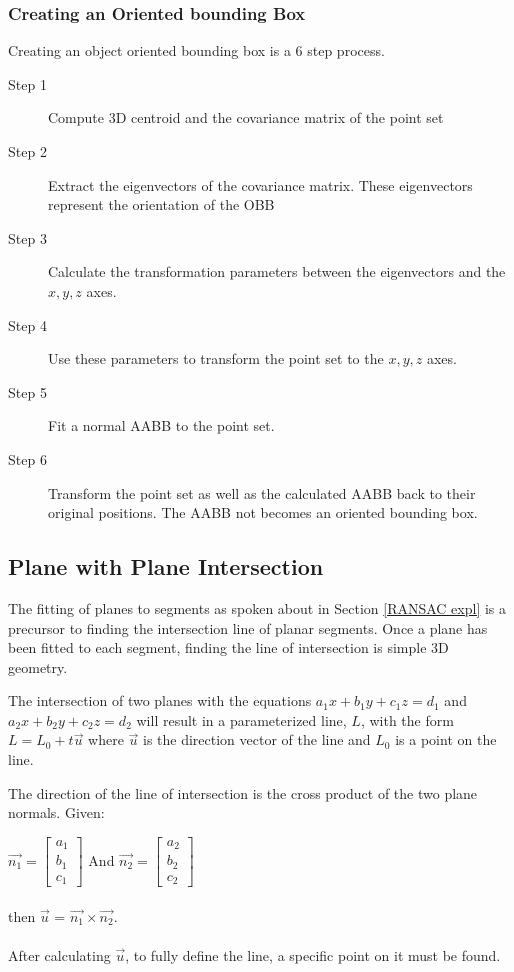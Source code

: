 		\subsubsection{Creating an Oriented bounding Box}
			Creating an object oriented bounding box is a 6 step process.
			\begin{description}
				\item[Step 1] Compute 3D centroid and the covariance matrix of the point set
									
				\item[Step 2] Extract the eigenvectors of the covariance matrix. These eigenvectors represent the orientation of the OBB
				
				\item[Step 3] Calculate the transformation parameters between the eigenvectors and the $x,y,z$ axes.
				
				\item[Step 4] Use these parameters to transform the point set to the $x,y,z$ axes.
				
				\item[Step 5] Fit a normal AABB to the point set.
				
				\item[Step 6] Transform the point set as well as the calculated AABB back to their original positions. The AABB not becomes an oriented bounding box.
			\end{description}
			
	\subsection{Plane with Plane Intersection}
	
	The fitting of planes to segments as spoken about in Section \ref{RANSAC expl} is a precursor to finding the intersection line of planar segments. Once a plane has been fitted to each segment, finding the line of intersection is simple 3D geometry.
	
	The intersection of two planes with the equations $a_1x + b_1y + c_1z = d_1$ and $a_2x + b_2y + c_2z = d_2$ will result in a parameterized line, $L$, with the form $L = L_0 + t\vec{u}$ where $\vec{u}$ is the direction vector of the line and $L_0$ is a point on the line.
	
	The direction of the line of intersection is the cross product of the two plane normals. Given:
	
	$\vec{n_1} = \begin{bmatrix}a_1\\b_1\\c_1\end{bmatrix}$  And $\vec{n_2} = \begin{bmatrix}a_2\\b_2\\c_2\end{bmatrix}$\\
	\\
	then $\vec{u}$  =  $\vec{n_1} \times \vec{n_2}  $.\\
	\\
	After calculating $\vec{u}$, to fully define the line, a specific point on it must be found.
	

